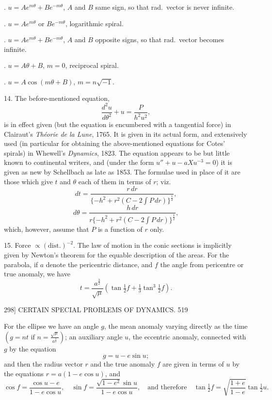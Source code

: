 \documentclass[11pt]{article}
\begin{document}
. $u=Ae^{m\theta}+Be^{-m\theta}$, $A$ and $B$ same sign, so that rad.\ vector is never infinite.

. $u=Ae^{m\theta}$ or $Be^{-m\theta}$, logarithmic spiral.

. $u=Ae^{m\theta}+Be^{-m\theta}$, $A$ and $B$ opposite signs, so that rad.\ vector becomes infinite.

. $u=A\theta+B$, $m=0$, reciprocal spiral.

. $u=A\cos(m\theta+B)$, $m=n\sqrt{-1}$.

14. The before-mentioned equation,
\[ \frac{d^{2}u}{d\theta^{2}}+u = \frac{P}{h^{2}u^{2}}, \]
is in effect given (but the equation is encumbered with a tangential force) in Clairaut's \emph{Th\'eorie de la Lune}, 1765. It is given in its actual form, and extensively used (in particular for obtaining the above-mentioned equations for Cotes' spirals) in Whewell's \emph{Dynamics}, 1823. The equation appears to be but little known to continental writers, and (under the form $u''+u-aXu^{-3}=0$) it is given as new by Schellbach as late as 1853. The formulae used in place of it are those which give $t$ and $\theta$ each of them in terms of $r$; viz.
\[ dt = \frac{r\,dr}{\{-h^{2}+r^{2}(C-2\int P\,dr)\}^{\frac{1}{2}}}, \]
\[ d\theta = \frac{h\,dr}{r\{-h^{2}+r^{2}(C-2\int P\,dr)\}^{\frac{1}{2}}}, \]
which, however, assume that $P$ is a function of $r$ only.

15. Force $\propto(\text{dist.})^{-2}$. The law of motion in the conic sections is implicitly given by Newton's theorem for the equable description of the areas. For the parabola, if $a$ denote the pericentric distance, and $f$ the angle from pericentre or true anomaly, we have
\[ t = \frac{a^{\frac{3}{2}}}{\sqrt{\mu}}\left(\tan\tfrac{1}{2}f+\tfrac{1}{3}\tan^{3}\tfrac{1}{2}f\right). \]

\newpage
\begin{center}
298] \hfill CERTAIN SPECIAL PROBLEMS OF DYNAMICS. \hfill 519
\end{center}

For the ellipse we have an angle $g$, the mean anomaly varying directly as the time $\left(g=nt\text{ if }n=\frac{\sqrt{\mu}}{a^{\frac{3}{2}}}\right)$; an auxiliary angle $u$, the eccentric anomaly, connected with $g$ by the equation
\[ g = u-e\sin u; \]
and then the radius vector $r$ and the true anomaly $f$ are given in terms of $u$ by the equations $r=a(1-e\cos u)$, and
\[ \cos f = \frac{\cos u-e}{1-e\cos u},\quad \sin f = \frac{\sqrt{1-e^{2}}\sin u}{1-e\cos u},\quad \text{and therefore}\quad \tan\tfrac{1}{2}f = \sqrt{\frac{1+e}{1-e}}\tan\tfrac{1}{2}u. \]
\end{document}
